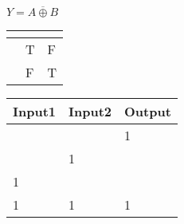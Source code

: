\documentclass[conference]{IEEEtran}
\begin{document}
\begin{table}
  $Y = \overline{A\oplus B}$ 

  \begin{tabular}{|P{1.5cm}|P{1.5cm}|P{1.5cm}|}
    \hline
     & \emph{\color{red}{F}}          & \emph{\color{red}{T}} \\ \hline
    \emph{\color{red}{F}}             & T & F    \\ \hline
    \emph{\color{red}{T}}             & F & T   \\ \hline
  \end{tabular}
    \newline\newline

  \begin{tabular}{|P{1.5cm}|P{1.5cm}|P{1.5cm}|}
    \hline
    Input1 & Input2          & Output \\ \hline
     &  &  1  \\ \hline
      &  1 &     \\  &   &     \\  & 1 &  1  \\ \hline
  \end{tabular}
  \newline\newline
  \newline\newline

  \end{table}
\end{document}
